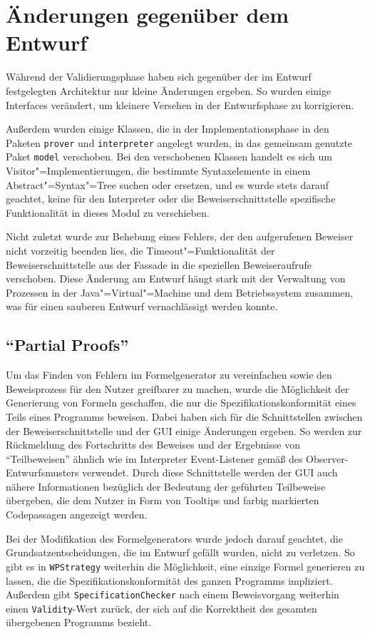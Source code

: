 \section{Änderungen gegenüber dem Entwurf}

Während der Validierungsphase haben sich gegenüber der im Entwurf festgelegten Architektur nur kleine Änderungen ergeben. So wurden einige Interfaces verändert, um kleinere Versehen in der Entwurfsphase zu korrigieren.

Außerdem wurden einige Klassen, die in der Implementationsphase in den Paketen \texttt{prover} und \texttt{interpreter} angelegt wurden, in das gemeinsam genutzte Paket \texttt{model} verschoben. Bei den verschobenen Klassen handelt es sich um Visitor"=Implementierungen, die bestimmte Syntaxelemente in einem Abstract"=Syntax"=Tree suchen oder ersetzen, und es wurde stets darauf geachtet, keine für den Interpreter oder die Beweiserschnittstelle spezifische Funktionalität in dieses Modul zu verschieben.

Nicht zuletzt wurde zur Behebung eines Fehlers, der den aufgerufenen Beweiser nicht vorzeitig beenden lies, die Timeout"=Funktionalität der Beweiserschnittstelle aus der Fassade in die speziellen Beweiseraufrufe verschoben. Diese Änderung am Entwurf hängt stark mit der Verwaltung von Prozessen in der Java"=Virtual"=Machine und dem Betriebssystem zusammen, was für einen sauberen Entwurf vernachlässigt werden konnte.

\subsection{"`Partial Proofs"'}

Um das Finden von Fehlern im Formelgenerator zu vereinfachen sowie den Beweisprozess für den Nutzer greifbarer zu machen, wurde die Möglichkeit der Generierung von Formeln geschaffen, die nur die Spezifikationskonformität eines Teils eines Programms beweisen. Dabei haben sich für die Schnittstellen zwischen der Beweiserschnittstelle und der GUI einige Änderungen ergeben. So werden zur Rückmeldung des Fortschritts des Beweises und der Ergebnisse von "`Teilbeweisen"' ähnlich wie im Interpreter Event-Listener gemäß des Observer-Entwurfsmusters verwendet. Durch diese Schnittstelle werden der GUI auch nähere Informationen bezüglich der Bedeutung der geführten Teilbeweise übergeben, die dem Nutzer in Form von Tooltips und farbig markierten Codepassagen angezeigt werden.

Bei der Modifikation des Formelgenerators wurde jedoch darauf geachtet, die Grundsatzentscheidungen, die im Entwurf gefällt wurden, nicht zu verletzen. So gibt es in \texttt{WPStrategy} weiterhin die Möglichkeit, eine einzige Formel generieren zu lassen, die die Spezifikationskonformität des ganzen Programms impliziert. Außerdem gibt \texttt{SpecificationChecker} nach einem Beweisvorgang weiterhin einen \texttt{Validity}-Wert zurück, der sich auf die Korrektheit des gesamten übergebenen Programms bezieht.
